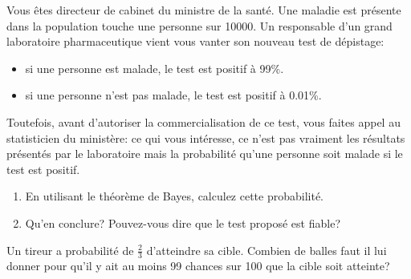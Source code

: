 \documentclass[a4paper]{article}
\newif\ifcorrection
\begin{document}
\exost Vous \^etes directeur de cabinet du ministre de la sant\'e. Une maladie est pr\'esente dans la population 
touche une personne sur 10000. Un responsable d'un grand laboratoire pharmaceutique vient vous vanter son nouveau test de d\'epistage: 
\begin{itemize}
 \item si une personne est malade, le test est positif \`a 99\%.
 \item si une personne n'est pas malade, le test est positif \`a 0.01\%. 
\end{itemize}
Toutefois, avant d'autoriser la commercialisation de ce test, vous faites appel au statisticien du minist\`ere:
ce qui vous int\'eresse, ce n'est pas vraiment les r\'esultats pr\'esent\'es par le laboratoire mais la probabilit\'e 
qu'une personne soit malade si le test est positif.
\begin{enumerate}
 \item En utilisant le th\'eor\`eme de Bayes, calculez cette probabilit\'e.
 \item Qu'en conclure? Pouvez-vous dire que le test propos\'e est fiable?
\end{enumerate}
 \ifcorrection
 \textcolor{red}{
  On note $M$ l'\'ev\'enement $\{\text{\^etre malade}\}$ et $T$ l'\'ev\'enement $\{\text{le test est positif}\}$.
  Nous avons $P(M) = \frac{1}{10000}=10^{-4}$, $P(T|M) = 0.99$ et $P(T|M^c)=0.0001=10^{-4}$ et donc $P(M^c)=1-\frac{1}{10000}$.
  En appliquant le th\'eor\`eme de Bayes nous avons:
  \begin{align}
   P(M|T) = \frac{P(M) P(T|M)}{P(T)} = \frac{P(M) P(T|M)}{P(M)P(T|M) + P(M^c)P(T|M^c)} = \frac{10^{-4} \times 0.99}{10^{-4} \times 0.99 + (1-10^{-4}) \times 10^{-4} } \approx 0.49. 
  \end{align}
  Il y a moins d'une chance sur deux que le patient soit malade si le test est positif. On ne peut donc pas vraiment dire que le test est fiable.
 }
 \fi

 \exost Un tireur a probabilit\'e de $\frac{2}{3}$ d'atteindre sa cible. Combien de balles faut il lui donner
pour qu'il y ait au moins 99 chances sur 100 que la cible soit atteinte?

 \ifcorrection
  \textcolor{red}{
  On note $A$ l'\'ev\'enement $\{\text{Le tireur a atteint sa cible} \}$. Alors $P(A^c) = \frac{1}{3}$.
  Comme chaque tir est ind\'ependant, alors la probabilit\'e de ne jamais atteindre sa cible au bout de $n$
  tirs est de $\frac{1}{3^n}$. On doit r\'esoudre l'\'equation:
  \begin{align}
   1 - \frac{1}{3^n} &> \frac{99}{100}\\
   1 - 0.99 &> \frac{1}{3^n}\\
   3^n &> \frac{1}{0.01}\\
   n \cdot \log(3) &> \log(100) \\
   n &> 4.19
  \end{align}
  On en d\'eduit qu'il faut lui donner au moins 5 balles.
 }
 \fi
\end{document}
